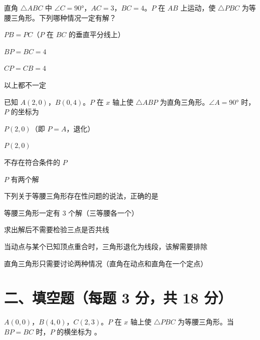 \documentclass{exam-zh}
\begin{document}
\begin{question}[points=3]
  直角 $\triangle ABC$ 中 $\angle C = 90°$，$AC=3$，$BC=4$。$P$ 在 $AB$ 上运动，使 $\triangle PBC$ 为等腰三角形。下列哪种情况一定有解？
  \begin{choices}
    \item $PB=PC$（$P$ 在 $BC$ 的垂直平分线上）
    \item $BP=BC=4$
    \item $CP=CB=4$
    \item 以上都不一定
  \end{choices}
\end{question}



\begin{question}[points=3]
  已知 $A(2,0)$，$B(0,4)$。$P$ 在 $x$ 轴上使 $\triangle ABP$ 为直角三角形。$\angle A=90°$ 时，$P$ 的坐标为
  \begin{choices}
    \item $P(2,0)$（即 $P=A$，退化）
    \item $P(2,0)$
    \item 不存在符合条件的 $P$
    \item $P$ 有两个解
  \end{choices}
\end{question}



\begin{question}[points=3]
  下列关于等腰三角形存在性问题的说法，正确的是
  \begin{choices}
    \item 等腰三角形一定有 $3$ 个解（三等腰各一个）
    \item 求出解后不需要检验三点是否共线
    \item 当动点与某个已知顶点重合时，三角形退化为线段，该解需要排除
    \item 直角三角形只需要讨论两种情况（直角在动点和直角在一个定点）
  \end{choices}
\end{question}


\section*{二、填空题（每题 3 分，共 18 分）}


\begin{question}[points=3]
  $A(0,0)$，$B(4,0)$，$C(2,3)$。$P$ 在 $x$ 轴上使 $\triangle PBC$ 为等腰三角形。当 $BP=BC$ 时，$P$ 的横坐标为 \fillin。
  \fillin
\end{question}
\end{document}
